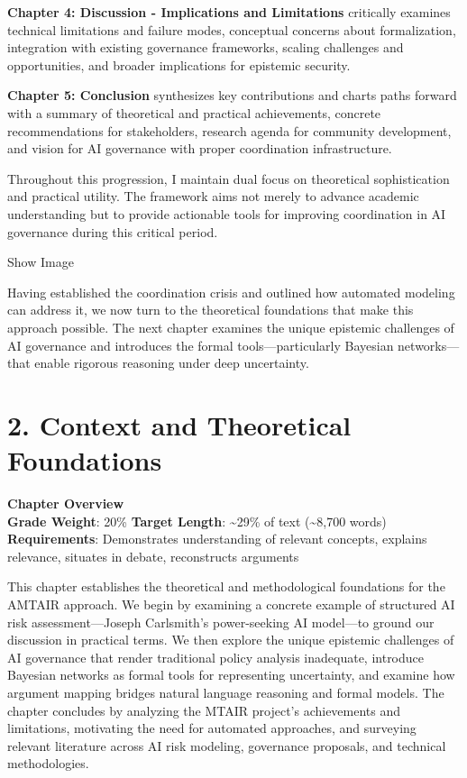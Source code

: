 \documentclass[
  11pt,
  letterpaper,
]{book}
\begin{document}
\textbf{Chapter 4: Discussion - Implications and Limitations} critically
examines technical limitations and failure modes, conceptual concerns
about formalization, integration with existing governance frameworks,
scaling challenges and opportunities, and broader implications for
epistemic security.

\textbf{Chapter 5: Conclusion} synthesizes key contributions and charts
paths forward with a summary of theoretical and practical achievements,
concrete recommendations for stakeholders, research agenda for community
development, and vision for AI governance with proper coordination
infrastructure.

Throughout this progression, I maintain dual focus on theoretical
sophistication and practical utility. The framework aims not merely to
advance academic understanding but to provide actionable tools for
improving coordination in AI governance during this critical period.

Show Image

Having established the coordination crisis and outlined how automated
modeling can address it, we now turn to the theoretical foundations that
make this approach possible. The next chapter examines the unique
epistemic challenges of AI governance and introduces the formal
tools---particularly Bayesian networks---that enable rigorous reasoning
under deep uncertainty.


\chapter{2. Context and Theoretical
Foundations}\label{context-and-theoretical-foundations}

\textbf{Chapter Overview}\\
\textbf{Grade Weight}: 20\% \textbar{} \textbf{Target Length}:
\textasciitilde29\% of text (\textasciitilde8,700 words)\\
\textbf{Requirements}: Demonstrates understanding of relevant concepts,
explains relevance, situates in debate, reconstructs arguments

This chapter establishes the theoretical and methodological foundations
for the AMTAIR approach. We begin by examining a concrete example of
structured AI risk assessment---Joseph Carlsmith's power-seeking AI
model---to ground our discussion in practical terms. We then explore the
unique epistemic challenges of AI governance that render traditional
policy analysis inadequate, introduce Bayesian networks as formal tools
for representing uncertainty, and examine how argument mapping bridges
natural language reasoning and formal models. The chapter concludes by
analyzing the MTAIR project's achievements and limitations, motivating
the need for automated approaches, and surveying relevant literature
across AI risk modeling, governance proposals, and technical
methodologies.
\end{document}
